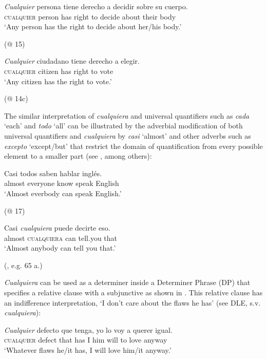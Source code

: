 \ea
\label{ex:key:24} %
  \gll \textit{Cualquier} persona tiene derecho a decidir sobre su cuerpo.\\
\textsc{cualquier} person has right to decide about their body\\
  \glt ‘Any person has the right to decide about her/his body.’
  
  (@ 15)
\z

\ea
\label{ex:key:25} %
 \gll \textit{Cualquier} ciudadano tiene derecho a elegir.\\
\textsc{cualquier} citizen has right to vote\\
  \glt ‘Any citizen has the right to vote.’

  (@ 14c)
\z

The similar interpretation of \textit{cualquiera} and universal quantifiers such as \textit{cada} ‘each’ and \textit{todo} ‘all’ can be illustrated by the adverbial modification of both universal quantifiers and \textit{cualquiera} by \textit{casi} ‘almost’ and other adverbs such as \textit{excepto} ‘except/but’ that restrict the domain of quantification from every possible element to a smaller part (see \citealt{Arregui2006}, among others):

\ea
\label{ex:key:26} %
  \gll Casi todos saben hablar inglés.\\
almost everyone know speak English\\
  \glt ‘Almost everbody can speak English.’

  (@ 17)
\z

\ea
\label{ex:key:27} %
  \gll Casi \textit{cualquiera} puede decirte eso.\\
almost \textsc{cualquiera} can tell.you that\\
  \glt ‘Almost anybody can tell you that.’

  (\citealt{Arregui2006}, e.g. 65 a.)
\z

\textit{Cualquiera} can be used as a determiner inside a Determiner Phrase (DP) that specifies a relative clause with a subjunctive as shown in . This relative clause has an indifference interpretation, ‘I don’t care about the flaws he has’ (see DLE, s.v. \textit{cualquiera}):

\ea %
\label{bkm:Ref512708} \gll \textit{Cualquier} defecto que tenga, yo lo voy a querer igual.\\
\textsc{cualquier} defect that has I him will to love anyway\\
  \glt ‘Whatever flaws he/it has, I will love him/it anyway.’

